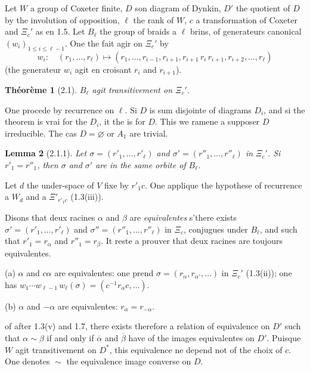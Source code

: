 \documentclass[11pt,a4paper]{article}
\theoremstyle{plain}
\newtheorem{theorem}{Th\'eor\`eme}[section]
\newtheorem{lemma}[theorem]{Lemma}
\theoremstyle{definition}
\begin{document}
Let $W$ a group of Coxeter finite, $D$ son diagram of Dynkin, $D'$ the quotient of $D$ by the involution of opposition, $\ell$ the rank of $W$, $c$ a transformation of Coxeter and $\Xi_c'$ as en 1.5. Let $B_\ell$ the group of braids a $\ell$ brins, of generateurs canonical $(w_i)_{1 \leq i \leq \ell-1}$. One the fait agir on $\Xi_c'$ by
\[
w_i : \quad (r_1, \ldots, r_\ell) \longmapsto (r_1, \ldots, r_{i-1}, r_{i+1}, r_{i+1}\, r_i\, r_{i+1}, r_{i+2}, \ldots, r_\ell)
\]
(the generateur $w_i$ agit en croisant $r_i$ and $r_{i+1}$).

\begin{theorem}[2.1]
$B_\ell$ agit transitivement on $\Xi_c'$.
\end{theorem}

One procede by recurrence on $\ell$. Si $D$ is sum disjointe of diagrams $D_i$, and si the theorem is vrai for the $D_i$, it the is for $D$. This we ramene a supposer $D$ irreducible. The cas $D = \varnothing$ or $A_1$ are trivial.

\begin{lemma}[2.1.1]
Let $\sigma = (r'_1, \ldots, r'_\ell)$ and $\sigma' = (r''_1, \ldots, r''_\ell)$ in $\Xi_c'$. Si $r'_1 = r''_1$, then $\sigma$ and $\sigma'$ are in the same orbite of $B_\ell$.
\end{lemma}

Let $d$ the under-space of $V$ fixe by $r'_1 c$. One applique the hypothese of recurrence a $W_d$ and a $\Xi'_{r'_1 c}$ (1.3(iii)).

\smallskip

Disons that deux racines $\alpha$ and $\beta$ are \emph{equivalentes} s'there exists $\sigma' = (r'_1, \ldots, r'_\ell)$ and $\sigma'' = (r''_1, \ldots, r''_\ell)$ in $\Xi_c$, conjugues under $B_\ell$, and such that $r'_1 = r_\alpha$ and $r''_1 = r_\beta$. It reste a prouver that deux racines are toujours equivalentes.

\smallskip

(a) $\alpha$ and $c\alpha$ are equivalentes: one prend $\sigma = (r_\alpha, r_{\alpha'}, \ldots)$ in $\Xi_c'$ (1.3(ii)); one has $w_1 \cdots w_{\ell-1}\, w_\ell(\sigma) = (c^{-1} r_\alpha c, \ldots)$.

\smallskip

\newpage

(b) $\alpha$ and $-\alpha$ are equivalentes: $r_\alpha = r_{-\alpha}$.

of after 1.3(v) and 1.7, there exists therefore a relation of equivalence on $D'$ such that $\alpha \sim \beta$ if and only if $\overline{\alpha}$ and $\overline{\beta}$ have of the images equivalentes on $D'$. Puisque $W$ agit transitivement on $D^*$, this equivalence ne depend not of the choix of $c$. One denotes $\sim$ the equivalence image converse on $D$.
\end{document}

